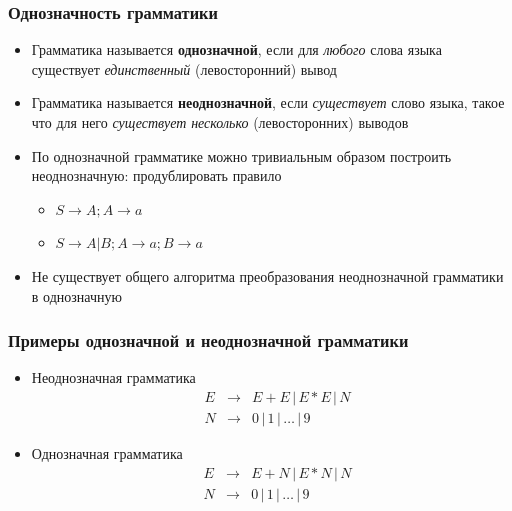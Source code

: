 \documentclass{beamer}
\begin{document}
\begin{frame}[fragile]
  \transwipe[direction=90]
  \frametitle{Однозначность грамматики}
  \begin{itemize}
    \item Грамматика называется \textbf{однозначной}, если для \emph{любого} слова языка существует \emph{единственный} (левосторонний) вывод
    \item Грамматика называется \textbf{неоднозначной}, если \emph{существует} слово языка, такое что для него \emph{существует} \emph{несколько} (левосторонних) выводов
  \end{itemize}

  \begin{itemize}
    \item По однозначной грамматике можно тривиальным образом построить неоднозначную: продублировать правило
    \begin{itemize}
      \item $S \rightarrow A; A \rightarrow a$
      \item $S \rightarrow A | B; A \rightarrow a; B \rightarrow a$
     \end{itemize}
     \item Не существует общего алгоритма преобразования неоднозначной грамматики в однозначную
   \end{itemize}
\end{frame}

\begin{frame}[fragile]
  \transwipe[direction=90]
  \frametitle{Примеры однозначной и неоднозначной грамматики}
  \begin{itemize}
    \item { Неоднозначная грамматика
  $$
  \begin{array}{crcl}
  &E& \rightarrow & E + E \, | \, E * E \, | \, N \\
  &N& \rightarrow & 0 \, | \, 1  \, | \, \dots \, | \, 9
  \end{array}
  $$
  }
    \item { Однозначная грамматика
  $$
  \begin{array}{crcl}
  &E& \rightarrow & E + N \, | \, E * N \, | \, N \\
  &N& \rightarrow & 0 \, | \, 1  \, | \, \dots \, | \, 9
  \end{array}
  $$
  }
  \end{itemize}
\end{frame}
\end{document}
